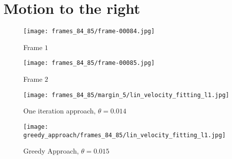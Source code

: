\documentclass[
	fontsize=12pt,
	paper=a4,
	twoside=false,
	numbers=noenddot,
	plainheadsepline,
	toc=listof,
	toc=bibliography
]{scrartcl}
\begin{document}
  
\FloatBarrier
\newpage

\section*{Motion to the right}

\begin{minipage}{\linewidth}
      \centering
      \begin{minipage}{0.45\linewidth}
          \begin{figure}[H]
              \texttt{[image: frames\_84\_85/frame-00084.jpg]}
              \caption{Frame $1$}
          \end{figure}
      \end{minipage}
      \hspace{0.05\linewidth}
      \begin{minipage}{0.45\linewidth}
          \begin{figure}[H]
              \texttt{[image: frames\_84\_85/frame-00085.jpg]}
              \caption{Frame $2$}
          \end{figure}
      \end{minipage}
\end{minipage}
\FloatBarrier

\begin{minipage}{\linewidth}
      \centering
      \begin{minipage}{0.45\linewidth}
          \begin{figure}[H]
              \texttt{[image: frames\_84\_85/margin\_5/lin\_velocity\_fitting\_l1.jpg]}
              \caption{One iteration approach, $\theta = 0.014$}
          \end{figure}
      \end{minipage}
      \hspace{0.05\linewidth}
      \begin{minipage}{0.45\linewidth}
          \begin{figure}[H]
              \texttt{[image: greedy\_approach/frames\_84\_85/lin\_velocity\_fitting\_l1.jpg]}
              \caption{Greedy Approach, $\theta = 0.015$}
          \end{figure}
      \end{minipage}
\end{minipage}
\end{document}
